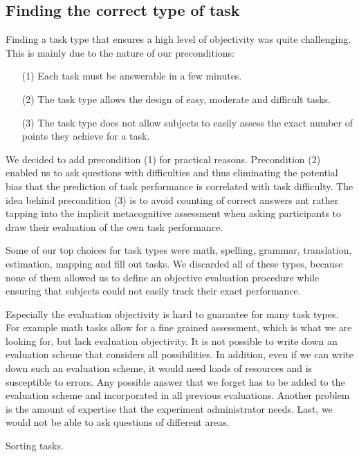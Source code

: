 \documentclass[../main/main.tex]{subfiles}
\begin{document}
	\subsection{Finding the correct type of task}
	\label{sec:finding_task_type}
	
	Finding a task type that ensures a high level of objectivity was quite challenging. This is mainly due to the nature of our preconditions:
	
	\begin{enumerate}
		\item[(1)] Each task must be answerable in a few minutes.
		\item[(2)] The task type allows the design of easy, moderate and difficult tasks.
		\item[(3)] The task type does not allow subjects to easily assess the exact number of points they achieve for a task.
	\end{enumerate}
	
	\noindent We decided to add precondition (1) for practical reasons. Precondition (2) enabled us to ask questions with difficulties and thus eliminating the potential bias that the prediction of task performance is correlated with task difficulty. The idea behind precondition (3) is to avoid counting of correct answers ant rather tapping into the implicit metacognitive assessment when asking participants to draw their evaluation of the own task performance.
	
	Some of our top choices for task types were math, spelling, grammar, translation, estimation, mapping and fill out tasks. We discarded all of these types, because none of them allowed us to define an objective evaluation procedure while ensuring that subjects could not easily track their exact performance.
	
	Especially the evaluation objectivity is hard to guarantee for many task types. For example math tasks allow for a fine grained assessment, which is what we are looking for, but lack evaluation objectivity. It is not possible to write down an evaluation scheme that considers all possibilities. In addition, even if we can write down such an evaluation scheme, it would need loads of resources and is susceptible to errors. Any possible answer that we forget has to be added to the evaluation scheme and incorporated in all previous evaluations. Another problem is the amount of expertise that the experiment administrator needs. Last, we would not be able to ask questions of different areas.
	
	Sorting tasks.
	
\end{document}
